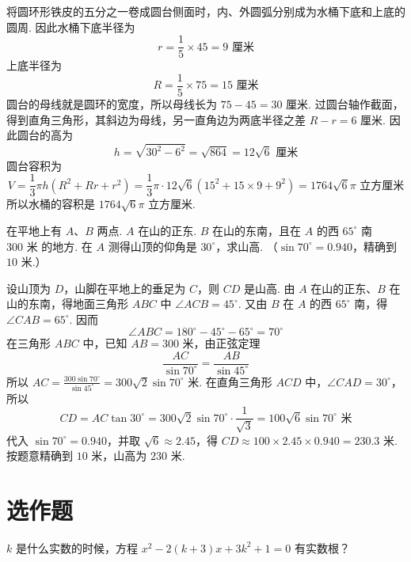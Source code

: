 \begin{solution}
将圆环形铁皮的五分之一卷成圆台侧面时，内、外圆弧分别成为水桶下底和上底的圆周. 因此水桶下底半径为
\[
r=\frac{1}{5}\times45=9\text{ 厘米}
\]
上底半径为
\[
R=\frac{1}{5}\times75=15\text{ 厘米}
\]
圆台的母线就是圆环的宽度，所以母线长为 \(75-45=30\text{ 厘米}\). 过圆台轴作截面，得到直角三角形，其斜边为母线，另一直角边为两底半径之差 \(R-r=6\text{ 厘米}\). 因此圆台的高为
\[
h=\sqrt{30^2-6^2}=\sqrt{864}=12\sqrt6\text{ 厘米}
\]
圆台容积为
\[
V=\frac{1}{3}\pi h\left(R^2+Rr+r^2\right)=\frac{1}{3}\pi\cdot12\sqrt6\left(15^2+15\times9+9^2\right)=1764\sqrt6\pi\text{ 立方厘米}
\]
所以水桶的容积是 \(1764\sqrt6\pi\text{ 立方厘米}\).
\end{solution}

\begin{problem}
在平地上有 \(A\)、\(B\) 两点. \(A\) 在山的正东. \(B\) 在山的东南，且在 \(A\) 的西 \(65^\circ\) 南 \(300\text{ 米}\) 的地方. 在 \(A\) 测得山顶的仰角是 \(30^\circ\)，求山高. （\(\sin70^\circ=0.940\)，精确到 \(10\text{ 米}\).）
\end{problem}

\begin{solution}
设山顶为 \(D\)，山脚在平地上的垂足为 \(C\)，则 \(CD\) 是山高. 由 \(A\) 在山的正东、\(B\) 在山的东南，得地面三角形 \(ABC\) 中 \(\angle ACB=45^\circ\). 又由 \(B\) 在 \(A\) 的西 \(65^\circ\) 南，得 \(\angle CAB=65^\circ\). 因而
\[
\angle ABC=180^\circ-45^\circ-65^\circ=70^\circ
\]
在三角形 \(ABC\) 中，已知 \(AB=300\text{ 米}\)，由正弦定理
\[
\frac{AC}{\sin70^\circ}=\frac{AB}{\sin45^\circ}
\]
所以 \(AC=\frac{300\sin70^\circ}{\sin45^\circ}=300\sqrt2\sin70^\circ\text{ 米}\).
在直角三角形 \(ACD\) 中，\(\angle CAD=30^\circ\)，所以
\[
CD=AC\tan30^\circ=300\sqrt2\sin70^\circ\cdot\frac{1}{\sqrt3}=100\sqrt6\sin70^\circ\text{ 米}
\]
代入 \(\sin70^\circ=0.940\)，并取 \(\sqrt6\approx2.45\)，得 \(CD\approx100\times2.45\times0.940=230.3\text{ 米}\). 按题意精确到 \(10\text{ 米}\)，山高为 \(230\text{ 米}\).

\end{solution}

\section{选作题}

\begin{problem}
\(k\) 是什么实数的时候，方程 \(x^2-2\left(k+3\right)x+3k^2+1=0\) 有实数根？
\end{problem}

